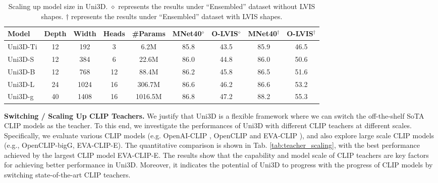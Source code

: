 \documentclass{article} \usepackage{iclr2024_conference,times}
\def\Ours{Uni3D\xspace}
\begin{document}
\begin{table}[tb]
    \centering
        \caption{Scaling up model size in Uni3D. $\diamond$ represents the results under ``Ensembled'' dataset without LVIS shapes. $\dagger$ represents the results under ``Ensembled'' dataset with LVIS shapes.
}
\vspace{0.2cm}

    \begin{tabular}{l|ccc|c|cc|cc}
        \toprule
        Model & Depth & Width & Heads & \#Params & MNet40$^\diamond$ & O-LVIS$^\diamond$ & MNet40$^\dagger$ & O-LVIS$^\dagger$ \\ \midrule
        Uni3D-Ti & 12  & 192 & 3 & 6.2M & 85.8 & 43.5 & 85.9 & 46.5 \\
        Uni3D-S & 12  & 384 & 6 & 22.6M & 86.0 & 44.8 & 86.0 & 50.6 \\
        Uni3D-B & 12 & 768 & 12 & 88.4M & 86.2 & 45.8 & 86.5 & 51.6\\
        Uni3D-L & 24 & 1024 & 16 & 306.7M & 86.6 & 46.2 & 86.6 & 53.2 \\             Uni3D-g & 40 & 1408 & 16 & 1016.5M & 86.8 & 47.2 & 88.2 & 55.3 \\
        \bottomrule
    \end{tabular}

    \label{tab:model_scaling}
    \vspace{-0.6cm}
\end{table}

\textbf{Switching / Scaling Up CLIP Teachers.}
We justify that \Ours is a flexible framework where we can switch the off-the-shelf SoTA CLIP models as the teacher. To this end, we investigate the performances of \Ours with different CLIP teachers at different scales. Specifically, we evaluate various CLIP models (e.g. OpenAI-CLIP \citep{radford2021learning}, OpenCLIP \citep{cherti2023reproducible} and EVA-CLIP \citep{sun2023eva}), and also explore large scale CLIP models (e.g., OpenCLIP-bigG, EVA-CLIP-E). The quantitative comparison is shown in Tab. \ref{tab:teacher_scaling}, with the best performance achieved by the largest CLIP model EVA-CLIP-E. The results show that the capability and model scale of CLIP teachers are key factors for achieving better performance in \Ours. Moreover, it indicates the potential of \Ours to progress with the progress of CLIP models by switching state-of-the-art CLIP teachers. 
\end{document}

